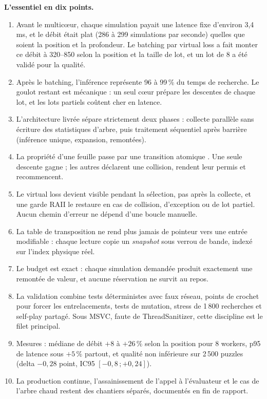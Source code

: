 \begin{essentiel}
\textbf{L'essentiel en dix points.}
\begin{enumerate}[leftmargin=1.4em,itemsep=2pt]
  \item Avant le multic\oe{}ur, chaque simulation payait une latence fixe
  d'environ 3,4\,ms, et le d\'ebit \'etait plat (286 \`a 299 simulations par
  seconde) quelles que soient la position et la profondeur. Le batching par
  virtual loss a fait monter ce d\'ebit \`a 320--850 selon la position et la
  taille de lot, et un lot de 8 a \'et\'e valid\'e pour la qualit\'e.
  \item Apr\`es le batching, l'inf\'erence repr\'esente 96 \`a 99\,\% du temps
  de recherche. Le goulot restant est m\'ecanique : un seul c\oe{}ur pr\'epare
  les descentes de chaque lot, et les lots partiels co\^utent cher en latence.
  \item L'architecture livr\'ee s\'epare strictement deux phases : collecte
  parall\`ele sans \'ecriture des statistiques d'arbre, puis traitement
  s\'equentiel apr\`es barri\`ere (inf\'erence unique, expansion, remont\'ees).
  \item La propri\'et\'e d'une feuille passe par une transition atomique
  . Une seule descente gagne ; les autres d\'eclarent
  une collision, rendent leur permis et recommencent.
  \item Le virtual loss devient visible pendant la s\'election, pas apr\`es la
  collecte, et une garde RAII le restaure en cas de collision, d'exception ou
  de lot partiel. Aucun chemin d'erreur ne d\'epend d'une boucle manuelle.
  \item La table de transposition ne rend plus jamais de pointeur vers une
  entr\'ee modifiable : chaque lecture copie un \emph{snapshot} sous verrou de
  bande, index\'e sur l'index physique r\'eel.
  \item Le budget est exact : chaque simulation demand\'ee produit exactement
  une remont\'ee de valeur, et aucune r\'eservation ne survit au repos.
  \item La validation combine tests d\'eterministes avec faux r\'eseau, points
  de crochet pour forcer les entrelacements, tests de mutation, stress de
  1\,800 recherches et self-play partag\'e. Sous MSVC, faute de
  ThreadSanitizer, cette discipline est le filet principal.
  \item Mesures : m\'ediane de d\'ebit $+8$ \`a $+26\,\%$ selon la position pour
  8 workers, p95 de latence sous $+5\,\%$ partout, et qualit\'e non
  inf\'erieure sur 2\,500 puzzles (delta $-0,28$ point, IC95
  $[-0,8\,;+0,24]$).
  \item La production continue, l'assainissement de l'appel \`a l'\'evaluateur
  et le cas de l'arbre chaud restent des chantiers s\'epar\'es, document\'es en
  fin de rapport.
\end{enumerate}
\end{essentiel}

